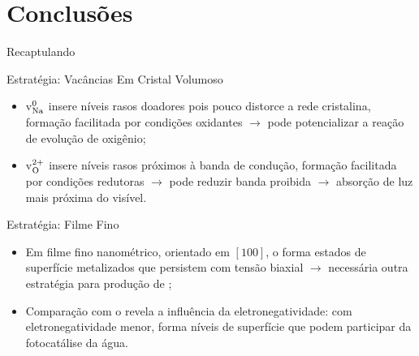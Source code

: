 \section{Conclusões}

\begin{frame}{Recaptulando}
	\begin{block}{Estratégia: Vacâncias Em Cristal Volumoso}
		\begin{itemize}
			\item v$_{\ce{Na}}^0$ insere níveis rasos doadores pois pouco distorce a rede cristalina, formação facilitada por condições oxidantes $\to$ pode potencializar a reação de evolução de oxigênio;
			\item v$_{\ce{O}}^{2+}$ insere níveis rasos próximos à banda de condução, formação facilitada por condições redutoras $\to$ pode reduzir banda proibida $\to$ absorção de luz mais próxima do visível.
		\end{itemize}
	\end{block}
	\begin{block}{Estratégia: Filme Fino}
		\begin{itemize}
		\item Em filme fino nanométrico, orientado em $[100]$, o  forma estados de superfície metalizados que persistem com tensão biaxial $\to$ necessária outra estratégia para produção de ;
		\item Comparação com o  revela a influência da eletronegatividade: com eletronegatividade menor,  forma níveis de superfície que podem participar da fotocatálise da água.
		\end{itemize}
	\end{block}
\end{frame}
